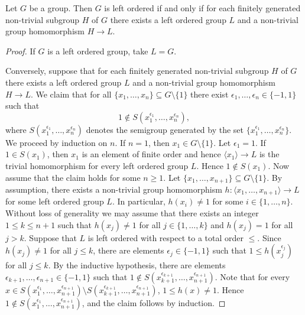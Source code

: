 
\begin{theorem}
Let $G$ be a group. Then $G$ is left ordered if and only if 
for each finitely generated non-trivial subgroup $H$ of $G$ there exists a left ordered group $L$ 
and a non-trivial group homomorphism $H\to L$.  
\end{theorem}

\begin{proof}
	If $G$ is a left ordered group, take $L=G$. 
	
	Conversely, suppose that for each finitely generated non-trivial subgroup $H$ of $G$ there exists a left ordered group $L$ 
and a non-trivial group homomorphism $H\to L$. We claim that for all $\{x_1,\dots,x_n\}\subseteq G\setminus\{1\}$ 
	there exist $\epsilon_1,\dots,\epsilon_n\in\{-1,1\}$ such that 
	\[
	1\not\in S(x_1^{\epsilon_1},\dots,x_n^{\epsilon_n}),
	\]
	where $S(x_1^{\epsilon_1},\dots,x_n^{\epsilon_n})$ denotes the semigroup generated by 
	the set $\{x_1^{\epsilon_1},\dots,x_n^{\epsilon_n}\}$. 
	We proceed by induction on $n$. If $n=1$, then $x_1\in G\setminus\{1\}$. Let $\epsilon_1=1$. If
	$1\in S(x_1)$, then $x_1$ is an element of finite order and hence $\langle x_1\rangle\to L$ is the trivial homomorphism for every left ordered group $L$. Hence $1\notin S(x_1)$.
    Now assume that the claim holds for some $n\geq 1$. Let $\{x_1,\dots,x_{n+1}\}\subseteq G\setminus\{1\}$. 
	By assumption, there exists a non-trivial group homomorphism 
	$h\colon\langle x_1,\dots,x_{n+1}\rangle\to L$ for some left ordered group $L$. In particular, $h(x_i)\ne 1$ for some $i\in\{1,\dots,n\}$. Without loss
	of generality we may assume that there exists an integer $1\leq k\leq n+1$ such that $h(x_j)\ne 1$ for all $j\in\{1,\dots,k\}$ and 
	$h(x_j)=1$ for all $j>k$. Suppose that $L$ is left ordered with respect to a total order $\leq$. Since $h(x_j)\ne 1$ for all $j\leq k$, there
	are elements $\epsilon_j\in\{-1,1\}$ such that $1\leq h(x_j^{\epsilon_j})$ for all $j\leq k$. By the inductive hypothesis, 
	there are elements $\epsilon_{k+1},\dots,\epsilon_{n+1}\in\{-1,1\}$ such that 
	$1\not\in S(x_{k+1}^{\epsilon_{k+1}},\dots,x_{n+1}^{\epsilon_{n+1}})$. Note that for every  $x\in S(x_1^{\epsilon_1},\dots,x_{n+1}^{\epsilon_{n+1}})\setminus S(x_{k+1}^{\epsilon_{k+1}},\dots,x_{n+1}^{\epsilon_{n+1}})$, $1\leq h(x)\neq 1$. Hence $1\notin S(x_1^{\epsilon_1},\dots ,x_{n+1}^{\epsilon_{n+1}})$, and the claim follows by induction.
	

\end{proof}
